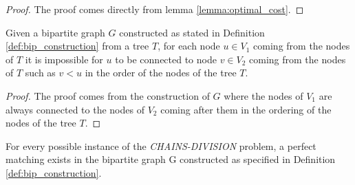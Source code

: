 \begin{proof}
    The proof comes directly from lemma \ref{lemma:optimal_cost}.
\end{proof}

\begin{lemma} \label{lemma:greater_nodes}
    Given a bipartite graph $G$ constructed as stated in Definition \ref{def:bip_construction} from a tree $T$, for each node $u \in V_1$ coming from the nodes of $T$ it is impossible for $u$ to be connected to node $v \in V_2$ coming from the nodes of $T$ such as $v < u$ in the order of the nodes of the tree $T$.
\end{lemma}

\begin{proof}
    The proof comes from the construction of $G$ where the nodes of $V_1$ are always connected to the nodes of $V_2$ coming after them in the ordering of the nodes of the tree $T$.
\end{proof}

\begin{lemma} \label{lemma:matching_existence}
    For every possible instance of the \textit{CHAINS-DIVISION} problem, a perfect matching exists in the bipartite graph G constructed as specified in Definition \ref{def:bip_construction}.
\end{lemma}

